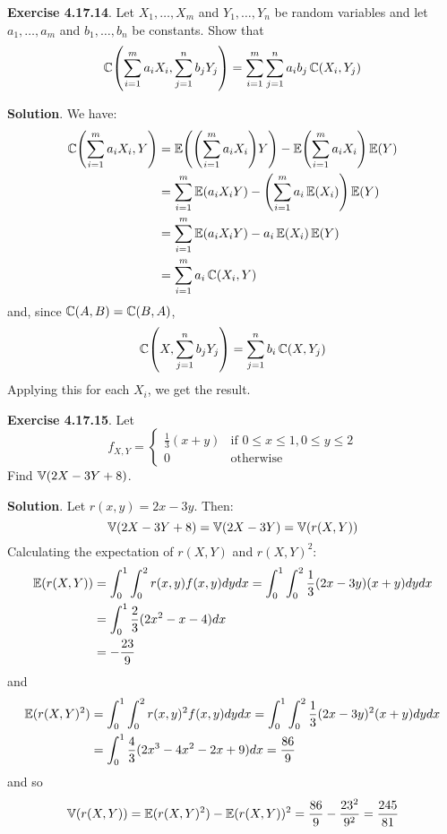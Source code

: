 \textbf{Exercise 4.17.14}. Let \(X_{1}, \dots, X_m\) and
\(Y_{1}, \dots, Y_{n}\) be random variables and let \(a_{1}, \dots, a_m\) and
\(b_{1}, \dots, b_{n}\) be constants. Show that
\[
\COV\left( \sum_{i=1}^m a_{i} X_{i} , \sum_{j=1}^{n} b_{j} Y_{j} \right) = \sum_{i=1}^m \sum_{j=1}^{n} a_{i} b_{j} \COV(X_{i}, Y_{j})
\]

\textbf{Solution}. We have:
\begin{align*}
\COV\left(\sum_{i=1}^m a_{i} X_{i}, Y\right) &= \EXP\left(\left( \sum_{i=1}^m a_{i} X_{i} \right) Y\right) - \EXP\left( \sum_{i=1}^m a_{i} X_{i} \right) \EXP(Y) \\
&= \sum_{i=1}^m \EXP(a_{i} X_{i} Y) - \left( \sum_{i=1}^m a_{i} \EXP(X_{i}) \right) \EXP(Y) \\
&= \sum_{i=1}^m \EXP(a_{i} X_{i} Y) -  a_{i} \EXP(X_{i}) \EXP(Y) \\
&= \sum_{i=1}^m a_{i} \COV(X_{i}, Y)
\end{align*}
and, since \(\operatorname{\mathbb{C}}(A, B) = \operatorname{\mathbb{C}}(B, A)\),
\[
\COV\left(X, \sum_{j=1}^{n} b_{j} Y_{j} \right) = \sum_{j=1}^{n} b_{i} \COV(X, Y_{j}) 
\]
Applying this for each \(X_{i}\), we get the result.

\textbf{Exercise 4.17.15}. Let
\[
f_{X, Y} = 
\begin{cases}
\frac{1}{3} (x + y) &\text{if } 0 \leq x \leq 1, 0 \leq y \leq 2 
\\
0 &\text{otherwise}
\end{cases}
\]
Find \(\operatorname{\mathbb{V}}(2X - 3Y + 8)\).

\textbf{Solution}. Let \(r(x, y) = 2x - 3y\). Then:
\[
\operatorname{\mathbb{V}}(2X - 3Y + 8) = \operatorname{\mathbb{V}}(2X - 3Y) = \operatorname{\mathbb{V}}(r(X, Y))
\]
Calculating the expectation of \(r(X, Y)\) and \(r(X, Y)^{2}\):
\begin{align*}
\operatorname{\mathbb{E}}(r(X, Y)) 
& = \int_{0}^{1} \int_{0}^{2} r(x, y) f(x, y) dy dx 
  = \int_{0}^{1} \int_{0}^{2} \frac{1}{3}(2x - 3y)(x + y) dy dx 
\\
& = \int_{0}^{1} \frac{2}{3}(2x^{2} - x - 4) dx 
\\
& = -\frac{23}{9}
\end{align*}
and
\begin{align*}
\operatorname{\mathbb{E}}(r(X, Y)^{2}) 
& = \int_{0}^{1} \int_{0}^{2} r(x, y)^{2} f(x, y) dy dx 
  = \int_{0}^{1} \int_{0}^{2} \frac{1}{3}(2x - 3y)^{2}(x + y) dy dx 
\\
& = \int_{0}^{1} \frac{4}{3}(2x^{3} - 4x^{2} - 2x + 9) dx
  = \frac{86}{9}
\end{align*}
and so
\[
\operatorname{\mathbb{V}}(r(X, Y)) = \operatorname{\mathbb{E}}(r(X, Y)^{2}) - \operatorname{\mathbb{E}}(r(X, Y))^{2} = \frac{86}{9} - \frac{23^{2}}{9^{2}} = \frac{245}{81}
\]

